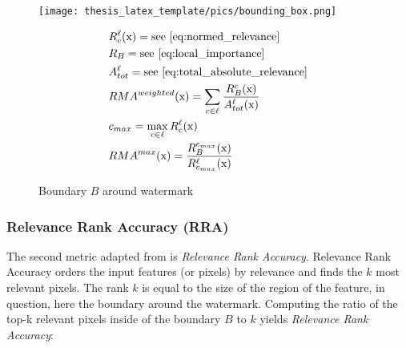 \begin{figure}[t!]
\begin{minipage}[t]{0.45\textwidth}
    \vspace{-\topskip}
        \texttt{[image: thesis\_latex\_template/pics/bounding\_box.png]}
\end{minipage}
\begin{minipage}[t]{0.45\textwidth}
\begin{align}\displaystyle
& R_c^{\ell}(\mathrm{x}) = \mathrm{ see \ \cref{eq:normed_relevance}} \\
& R_B = \mathrm{ see \ \cref{eq:local_importance}} \\
& A_{tot}^{\ell} = \mathrm{ see \ \cref{eq:total_absolute_relevance}} \\
& RMA^{weighted}(\mathrm{x}) = \sum_{c \in \ell}  \frac{R_{B}^{c}(\mathrm{x})}{A_{tot}^{\ell}(\mathrm{x})} \\
&c_{max} = \max_{c \in \ell} R_c^{\ell}(\mathrm{x}) \\
& RMA^{max}(\mathrm{x}) = \frac{
R_{B}^{c_{max}}(\mathrm{x})}{R_{c_{max}}^{\ell}(\mathrm{x})} 
\end{align}
\end{minipage}
\caption{Boundary $B$ around watermark}
\label{fig:bounding_box}
\end{figure}

\subsubsection{Relevance Rank Accuracy (RRA)}
The second metric adapted from \citet{Arras2022} is \textit{Relevance Rank Accuracy}.  
Relevance Rank Accuracy orders the input features (or pixels) by relevance and finds the $k$ most relevant pixels. The rank $k$ is equal to the size of the region of the feature, in question, here the boundary around the watermark. Computing the ratio of the top-k relevant pixels inside of the boundary $B$ to $k$ yields \textit{Relevance Rank Accuracy}:

